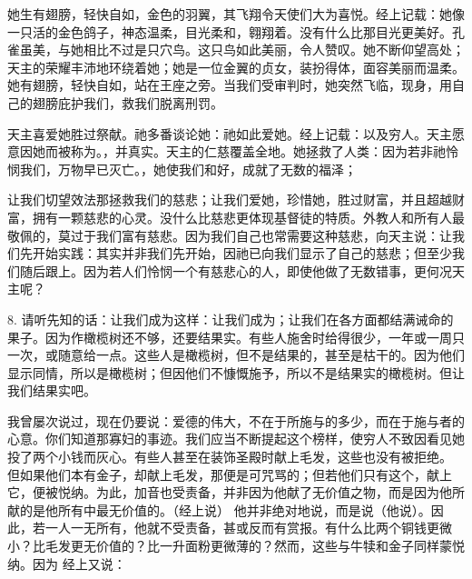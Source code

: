 她生有翅膀，轻快自如，金色的羽翼，其飞翔令天使们大为喜悦。经上记载：她像一只活的金色鸽子，神态温柔，目光柔和，翱翔着。没有什么比那目光更美好。孔雀虽美，与她相比不过是只穴鸟。这只鸟如此美丽，令人赞叹。她不断仰望高处；天主的荣耀丰沛地环绕着她；她是一位金翼的贞女，装扮得体，面容美丽而温柔。她有翅膀，轻快自如，站在王座之旁。当我们受审判时，她突然飞临，现身，用自己的翅膀庇护我们，救我们脱离刑罚。\par

天主喜爱她胜过祭献。祂多番谈论她：祂如此爱她。经上记载：以及穷人。天主愿意因她而被称为。，并真实。天主的仁慈覆盖全地。她拯救了人类：因为若非祂怜悯我们，万物早已灭亡。，她使我们和好，成就了无数的福泽；\par

让我们切望效法那拯救我们的慈悲；让我们爱她，珍惜她，胜过财富，并且超越财富，拥有一颗慈悲的心灵。没什么比慈悲更体现基督徒的特质。外教人和所有人最敬佩的，莫过于我们富有慈悲。因为我们自己也常需要这种慈悲，向天主说：让我们先开始实践：其实并非我们先开始，因祂已向我们显示了自己的慈悲；但至少我们随后跟上。因为若人们怜悯一个有慈悲心的人，即使他做了无数错事，更何况天主呢？\par

8. 请听先知的话：让我们成为这样：让我们成为；让我们在各方面都结满诫命的果子。因为作橄榄树还不够，还要结果实。有些人施舍时给得很少，一年或一周只一次，或随意给一点。这些人是橄榄树，但不是结果的，甚至是枯干的。因为他们显示同情，所以是橄榄树；但因他们不慷慨施予，所以不是结果实的橄榄树。但让我们结果实吧。\par

我曾屡次说过，现在仍要说：爱德的伟大，不在于所施与的多少，而在于施与者的心意。你们知道那寡妇的事迹。我们应当不断提起这个榜样，使穷人不致因看见她投了两个小钱而灰心。有些人甚至在装饰圣殿时献上毛发，这些也没有被拒绝。 但如果他们本有金子，却献上毛发，那便是可咒骂的；但若他们只有这个，献上它，便被悦纳。为此，加音也受责备，并非因为他献了无价值之物，而是因为他所献的是他所有中最无价值的。（经上说） 他并非绝对地说，而是说（他说）。因此，若一人一无所有，他就不受责备，甚或反而有赏报。有什么比两个铜钱更微小？比毛发更无价值的？比一升面粉更微薄的？然而，这些与牛犊和金子同样蒙悦纳。因为 经上又说：\par

